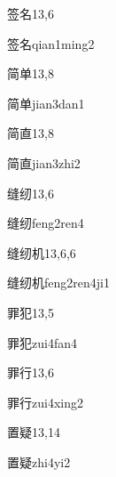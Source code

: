 \begin{entry}{签名}{13,6}
  \begin{phonetics}{签名}{qian1ming2}
  \end{phonetics}
\end{entry}

\begin{entry}{简单}{13,8}
  \begin{phonetics}{简单}{jian3dan1}
  \end{phonetics}
\end{entry}

\begin{entry}{简直}{13,8}
  \begin{phonetics}{简直}{jian3zhi2}
  \end{phonetics}
\end{entry}

\begin{entry}{缝纫}{13,6}
  \begin{phonetics}{缝纫}{feng2ren4}
  \end{phonetics}
\end{entry}

\begin{entry}{缝纫机}{13,6,6}
  \begin{phonetics}{缝纫机}{feng2ren4ji1}
  \end{phonetics}
\end{entry}

\begin{entry}{罪犯}{13,5}
  \begin{phonetics}{罪犯}{zui4fan4}
  \end{phonetics}
\end{entry}

\begin{entry}{罪行}{13,6}
  \begin{phonetics}{罪行}{zui4xing2}
  \end{phonetics}
\end{entry}

\begin{entry}{置疑}{13,14}
  \begin{phonetics}{置疑}{zhi4yi2}
  \end{phonetics}
\end{entry}

